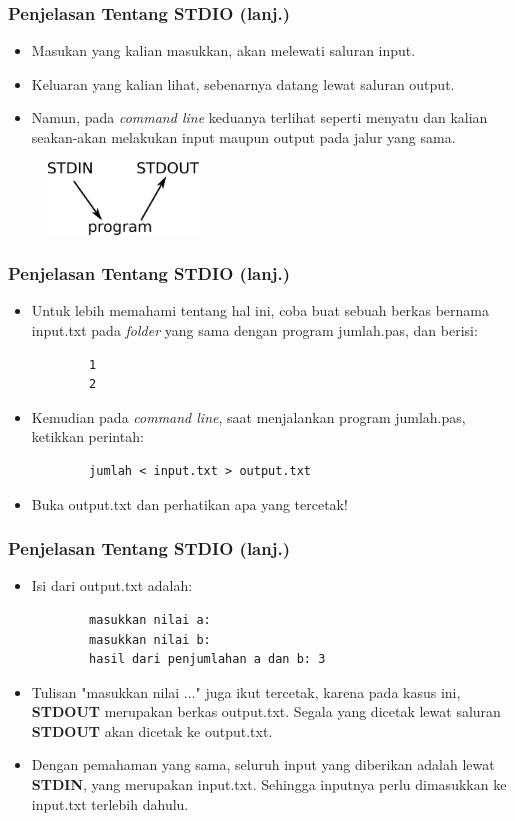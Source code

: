 \documentclass{beamer}
\begin{document}
\begin{frame}
\frametitle{Penjelasan Tentang STDIO (lanj.)}
\begin{itemize}
	\item Masukan yang kalian masukkan, akan melewati saluran input.
	\item Keluaran yang kalian lihat, sebenarnya datang lewat saluran output.
	\item Namun, pada \textit{command line} keduanya terlihat seperti menyatu dan kalian seakan-akan melakukan input maupun output pada jalur yang sama.
\end{itemize}
\begin{figure}
	\includegraphics[width=4cm]{asset/g1.png}
\end{figure}
\end{frame}

\begin{frame}[fragile]
\frametitle{Penjelasan Tentang STDIO (lanj.)}
\begin{itemize}
	\item Untuk lebih memahami tentang hal ini, coba buat sebuah berkas bernama input.txt pada \textit{folder} yang sama dengan program jumlah.pas, dan berisi:
	\begin{lstlisting}
		1
		2
	\end{lstlisting}
	\item Kemudian pada \textit{command line}, saat menjalankan program jumlah.pas, ketikkan perintah:
	\begin{lstlisting}
		jumlah < input.txt > output.txt
	\end{lstlisting}
	\item Buka output.txt dan perhatikan apa yang tercetak!
\end{itemize}
\end{frame}

\begin{frame}[fragile]
\frametitle{Penjelasan Tentang STDIO (lanj.)}
\begin{itemize}
	\item Isi dari output.txt adalah:
	\begin{lstlisting}
		masukkan nilai a: 
		masukkan nilai b: 
		hasil dari penjumlahan a dan b: 3
	\end{lstlisting}
	\item Tulisan "masukkan nilai ..." juga ikut tercetak, karena pada kasus ini, \textbf{STDOUT} merupakan berkas output.txt. Segala yang dicetak lewat saluran \textbf{STDOUT} akan dicetak ke output.txt.
	\item Dengan pemahaman yang sama, seluruh input yang diberikan adalah lewat \textbf{STDIN}, yang merupakan input.txt. Sehingga inputnya perlu dimasukkan ke input.txt terlebih dahulu.
\end{itemize}
\end{frame}
\end{document}
